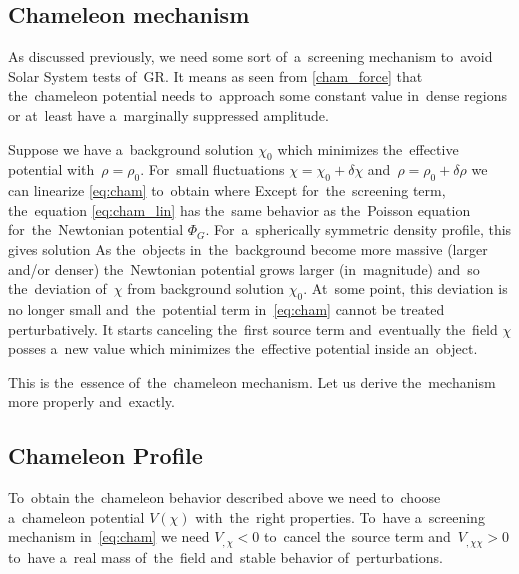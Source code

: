 \subsection{Chameleon mechanism}
As discussed previously, we need some sort of~a~screening mechanism to~avoid Solar System tests of~GR. It means as seen from \eqref{cham_force} that the~chameleon potential needs to~approach some constant value in~dense regions or at~least have a~marginally suppressed amplitude.

Suppose we have a~background solution $\chi_0$ which minimizes the~effective potential with~$\rho=\rho_0$. For~small fluctuations $\chi=\chi_0+\delta\chi$ and~$\rho=\rho_0+\delta\rho$ we can linearize \eqref{eq:cham} to~obtain
where
Except for~the~screening term, the~equation \eqref{eq:cham_lin} has the~same behavior as the~Poisson equation for~the~Newtonian potential $\Phi_G$. For~a~spherically symmetric density profile, this gives solution
As the~objects in~the~background become more massive (larger and/or denser) the~Newtonian potential grows larger (in~magnitude) and~so the~deviation of~$\chi$ from background solution $\chi_0$. At~some point, this deviation is no longer small and~the~potential term in~\eqref{eq:cham} cannot be treated perturbatively. It starts canceling the~first source term and~eventually the~field $\chi$ posses a~new value which minimizes the~effective potential inside an~object.

This is the~essence of~the~chameleon mechanism. Let us derive the~mechanism more properly and~exactly. 
\subsection{Chameleon Profile}
\label{cham_prof}
To~obtain the~chameleon behavior described above we need to~choose a~chameleon potential $V(\chi)$ with~the~right properties. To~have a~screening mechanism in~\eqref{eq:cham} we need $V_{,\chi}<0$ to~cancel the~source term and~$V_{,\chi\chi}>0$ to~have a~real mass of~the~field and~stable behavior of~perturbations.

